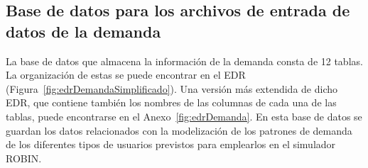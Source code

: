 \begin{table}[H]
\centering
{}
\caption{Muestra de datos obtenidos de la sentencia del Listado~\ref{src:ejemploUsoTablasAuxiliares}}
\label{tab:ejemploTablasAuxiliares}
\end{table}

\subsection{Base de datos para los archivos de entrada de datos de la demanda}
\label{subsec:dBDemand}
La base de datos que almacena la información de la demanda consta de 12 tablas. La organización de estas se puede encontrar en el \acrshort{EDR} (Figura~\ref{fig:edrDemandaSimplificado}). Una versión más extendida de dicho \acrshort{EDR}, que contiene también los nombres de las columnas de cada una de las tablas, puede encontrarse en el Anexo~\ref{fig:edrDemanda}. En esta base de datos se guardan los datos relacionados con la modelización de los patrones de demanda de los diferentes tipos de usuarios previstos para emplearlos en el simulador \acrshort{ROBIN}.

